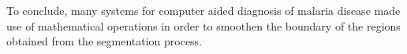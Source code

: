 \documentclass[sensors,review,submit,moreauthors,pdftex,10pt,a4paper]{mdpi}
\begin{document}
	
	To conclude, many systems for computer aided diagnosis of malaria disease made use of mathematical operations in order to smoothen the boundary of the regions obtained from the segmentation process.
	
	
	
	
\end{document}
